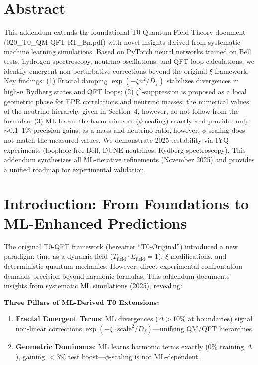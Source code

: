 \section*{Abstract}
		This addendum extends the foundational T0 Quantum Field Theory document (020\_T0\_QM-QFT-RT\_En.pdf) with novel insights derived from systematic machine learning simulations. Based on PyTorch neural networks trained on Bell tests, hydrogen spectroscopy, neutrino oscillations, and QFT loop calculations, we identify emergent non-perturbative corrections beyond the original $\xi$-framework. Key findings: (1) Fractal damping $\exp(-\xi n^2/D_f)$ stabilizes divergences in high-$n$ Rydberg states and QFT loops; (2) $\xi^2$-suppression is proposed as a local geometric phase for EPR correlations and neutrino masses; the numerical values of the neutrino hierarchy given in Section~4, however, do not follow from the formulas; (3) ML learns the harmonic core ($\phi$-scaling) exactly and provides only $\sim$0.1--1\% precision gains; as a mass and neutrino ratio, however, $\phi$-scaling does not match the measured values. We demonstrate 2025-testability via IYQ experiments (loophole-free Bell, DUNE neutrinos, Rydberg spectroscopy). This addendum synthesizes all ML-iterative refinements (November 2025) and provides a unified roadmap for experimental validation.

	
	
	\section{Introduction: From Foundations to ML-Enhanced Predictions}
	
	The original T0-QFT framework (hereafter ``T0-Original'') introduced a new paradigm: time as a dynamic field ($T_{\text{field}} \cdot E_{\text{field}} = 1$), $\xi$-modifications, and deterministic quantum mechanics. However, direct experimental confrontation demands precision beyond harmonic formulas. This addendum documents insights from systematic ML simulations (2025), revealing:
	
	\begin{tcolorbox}[colback=green!5!white,colframe=green!75!black,title={Core ML Findings}]
		\textbf{Three Pillars of ML-Derived T0 Extensions:}
		\begin{enumerate}
			\item \textbf{Fractal Emergent Terms}: ML divergences ($\Delta>10\%$ at boundaries) signal non-linear corrections $\exp(-\xi \cdot \text{scale}^2/D_f)$---unifying QM/QFT hierarchies.
			\item \textbf{Geometric Dominance}: ML learns harmonic terms exactly (0\% training $\Delta$), gaining $<$3\% test boost---$\phi$-scaling is not ML-dependent.
		\end{enumerate}
	\end{tcolorbox}
	

